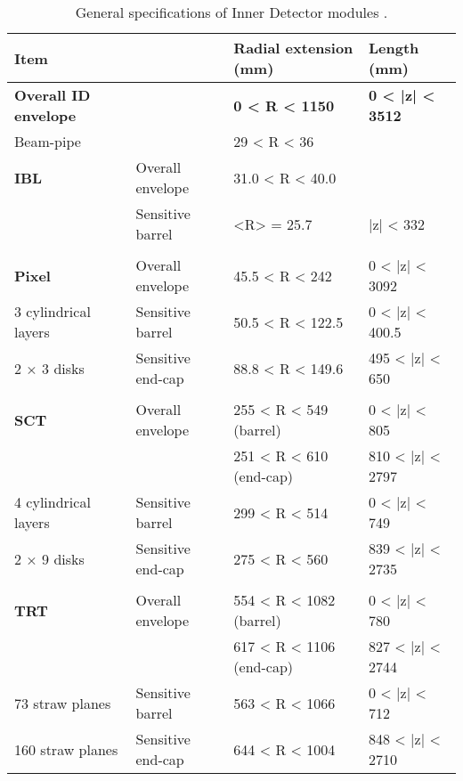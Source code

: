 \begin{table} \centering \footnotesize
\caption{General specifications of Inner Detector modules \cite{atlas_tdr} \cite{insertable_Blayer}.}
\label{tab:ID_specs}
\begin{tabular}{ |l l|l|l| }
    \hline
    \textbf{Item}                   & &       \textbf{Radial extension (mm)} & \textbf{Length (mm)} \\
    \hline
    \textbf{Overall ID envelope}    & &         \textbf{0 < R < 1150}        &\textbf{0 < |z| < 3512} \\
    Beam-pipe                       & &            29 < R < 36    & \\
    \hline

    \textbf{IBL}          &  Overall envelope  &  31.0 < R < 40.0          &             \\    
                          &  Sensitive barrel  &  <R> = 25.7               &  |z| < 332 \\    
    &&&\\
    \textbf{Pixel}        &  Overall envelope  &  45.5 < R < 242           &  0 < |z| < 3092 \\
    3 cylindrical layers  &  Sensitive barrel  &  50.5 < R < 122.5         &  0 < |z| < 400.5 \\
    2 × 3 disks           &  Sensitive end-cap &  88.8 < R < 149.6         &  495 < |z| < 650 \\
    &&&\\
    \textbf{SCT}          &  Overall envelope  &  255 < R < 549 (barrel)   &  0 < |z| < 805 \\
                          &                    &  251 < R < 610 (end-cap)  &  810 < |z| < 2797 \\
    4 cylindrical layers  &  Sensitive barrel  &  299 < R < 514            &  0 < |z| < 749 \\
    2 × 9 disks           &  Sensitive end-cap &  275 < R < 560            &  839 < |z| < 2735 \\
    &&&\\
    \textbf{TRT}          &  Overall envelope  &  554 < R < 1082 (barrel)  &  0 < |z| < 780 \\
                          &                    &  617 < R < 1106 (end-cap) &  827 < |z| < 2744 \\
    73 straw planes       &  Sensitive barrel  &  563 < R < 1066           &  0 < |z| < 712 \\
    160 straw planes      &  Sensitive end-cap &  644 < R < 1004           &  848 < |z| < 2710 \\
    \hline
\end{tabular} \end{table}
